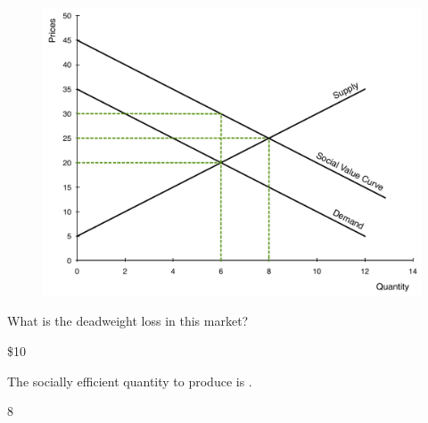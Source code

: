 \documentclass[pdf, handout]{beamer}
\begin{document}
\begin{frame}
	
	\begin{figure}[H]
		\centering
		\includegraphics[scale=.25]{Exam_Review5.pdf}
	\end{figure}
	
	What is the deadweight loss in this market?
	
	\pause
	\begin{flushright}
		
		\color{red} \$10
		
	\end{flushright}
	
	\pause
	The socially efficient quantity to produce is \underline{\hspace{2cm}}.
	
	\pause
	\begin{flushright}
		
		\color{red} 8
		
	\end{flushright}
	
\end{frame}
\end{document}
